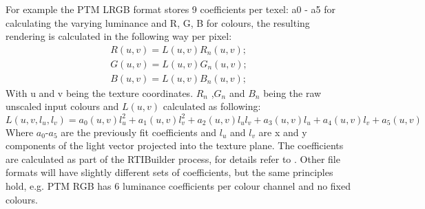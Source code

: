 For example the PTM LRGB format\cite*{malzbender_polynomial_2001} stores 9
coefficients per texel: a0 - a5 for calculating the varying luminance and R, G, B
for colours, the resulting rendering is calculated in the following way per pixel:
\begin{align*}
R(u,v) = L(u,v)R_{n}(u,v);\\
G(u,v) = L(u,v)G_{n}(u,v);\\
B(u,v) = L(u,v)B_{n}(u,v);
\end{align*}
With u and v being the texture coordinates. $R_{n}$ ,$G_{n}$ and $B_{n}$ being
the raw unscaled input colours and $L(u, v)$ calculated as following:
\begin{equation*}
  L(u,v,l_{u},l_{v})=a_{0}(u,v)l_{u}^{2}+a_{1}(u,v)l_{v}^{2}+a_{2}(u,v)l_{u}l_{v}+a_{3}(u,v)l_{u}+a_{4}(u,v)l_{v}+a_{5}(u,v)
\end{equation*}
Where $a_{0}$-$a_{5}$ are the previously fit coefficients and $l_{u}$ and
$l_{v}$ are x and y components of the light vector projected into the texture
plane. The coefficients are calculated as part of the RTIBuilder process, for details refer to \cite*{malzbender_polynomial_2001}.
Other file formats will have slightly different sets of coefficients, but the
same principles hold, e.g. PTM RGB has 6 luminance coefficients per colour
channel and no fixed colours.

